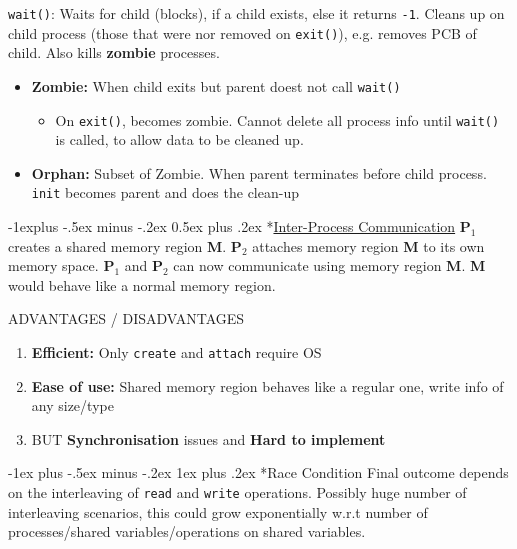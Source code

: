 \documentclass[10pt,landscape]{article}
\makeatletter
\renewcommand{\subsection}{\@startsection{section}{1}{0mm}%
                                {-1ex plus -.5ex minus -.2ex}%
                                {0.5ex plus .2ex}%
                                {\normalfont\large\bfseries}}
\renewcommand{\subsection}{\@startsection{subsection}{2}{0mm}%
                                {-1explus -.5ex minus -.2ex}%
                                {0.5ex plus .2ex}%
                                {\normalfont\normalsize\bfseries}}
\renewcommand{\subsubsection}{\@startsection{subsubsection}{3}{0mm}%
                                {-1ex plus -.5ex minus -.2ex}%
                                {1ex plus .2ex}%
                                {\normalfont\small\bfseries}}
\makeatother
\begin{document}
\begin{multicols*}{3}
\verb|wait()|: Waits for child (blocks), if a child exists, else it returns \verb|-1|. Cleans up on child process 
(those that were nor removed on \verb|exit()|), e.g. removes PCB of child. Also kills \textbf{zombie} processes.
\begin{itemize}[topsep=0pt,noitemsep,wide=0pt, leftmargin=\dimexpr{} + 2\relax]
    \item \textbf{Zombie:} When child exits but parent doest not call \verb|wait()|
    \begin{itemize}[topsep=0pt,noitemsep,wide=0pt, leftmargin=\dimexpr{} + 2\relax]
        \item On \verb|exit()|, becomes zombie. Cannot delete all process info until \verb|wait()| is called, to allow data to be cleaned up.
    \end{itemize}
    \item \textbf{Orphan:} Subset of Zombie. When parent terminates before child process. \verb|init| becomes parent and does the clean-up
\end{itemize}

\subsection*{\underline{Inter-Process Communication}}
\textbf{P$_1$} creates a shared memory region \textbf{M}. \textbf{P$_2$} attaches memory region \textbf{M} to its own memory space.
\textbf{P$_1$} and \textbf{P$_2$} can now communicate using memory region \textbf{M}. \textbf{M} would behave like a normal memory region.

ADVANTAGES / DISADVANTAGES
\begin{enumerate}[topsep=0pt,noitemsep,wide=0pt, leftmargin=\dimexpr\labelwidth + 2\labelsep\relax, topsep=0pt]
    \item \textbf{Efficient:} Only \verb|create| and \verb|attach| require OS
    \item \textbf{Ease of use:} Shared memory region behaves like a regular one, write info of any size/type
    \item BUT \textbf{Synchronisation} issues and \textbf{Hard to implement}
\end{enumerate}


\subsubsection*{Race Condition}
Final outcome depends on the interleaving of \verb|read| and \verb|write| operations.
Possibly huge number of interleaving scenarios, this could grow exponentially w.r.t number of processes/shared variables/operations on shared variables.


\end{multicols*}
\end{document}
